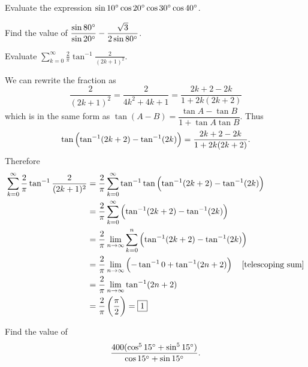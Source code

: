 \begin{prbm}
Evaluate the expression $\sin10\degree\cos20\degree\cos30\degree\cos40\degree$.
\end{prbm}

\begin{solution}

\end{solution}

\begin{prbm}
Find the value of $\dfrac{\sin80\degree}{\sin20\degree}-\dfrac{\sqrt{3}}{2\sin80\degree}$.
\end{prbm}

\begin{solution}

\end{solution}

\begin{prbm}
Evaluate $\displaystyle\sum_{k=0}^\infty\frac{2}{\pi}\tan^{-1}\frac{2}{(2k+1)^2}$.
\end{prbm}

\begin{solution}
We can rewrite the fraction as
\[ \frac{2}{(2k+1)^2}=\frac{2}{4k^2+4k+1}=\frac{2k+2-2k}{1+2k(2k+2)} \]
which is in the same form as $\tan(A-B)=\dfrac{\tan A-\tan B}{1+\tan A\tan B}$. Thus
\[ \tan\left(\tan^{-1}(2k+2)-\tan^{-1}(2k)\right)=\frac{2k+2-2k}{1+2k(2k+2)}. \]
Therefore
\begin{align*}
\sum_{k=0}^\infty\frac{2}{\pi}\tan^{-1}\frac{2}{(2k+1)^2}
&= \frac{2}{\pi}\sum_{k=0}^\infty\tan^{-1}\tan\left(\tan^{-1}(2k+2)-\tan^{-1}(2k)\right) \\
&= \frac{2}{\pi}\sum_{k=0}^\infty\left(\tan^{-1}(2k+2)-\tan^{-1}(2k)\right) \\
&= \frac{2}{\pi}\lim_{n\to\infty}\sum_{k=0}^n\left(\tan^{-1}(2k+2)-\tan^{-1}(2k)\right) \\
&= \frac{2}{\pi}\lim_{n\to\infty}\left(-\tan^{-1}0+\tan^{-1}(2n+2)\right) \quad \text{[telescoping sum]} \\
&= \frac{2}{\pi}\lim_{n\to\infty}\tan^{-1}(2n+2) \\
&= \frac{2}{\pi}\left(\frac{\pi}{2}\right)=\boxed{1}
\end{align*}
\end{solution}

\begin{prbm}
Find the value of 
\[ \frac{400(\cos^515\degree+\sin^515\degree)}{\cos15\degree+\sin15\degree}. \]
\end{prbm}

